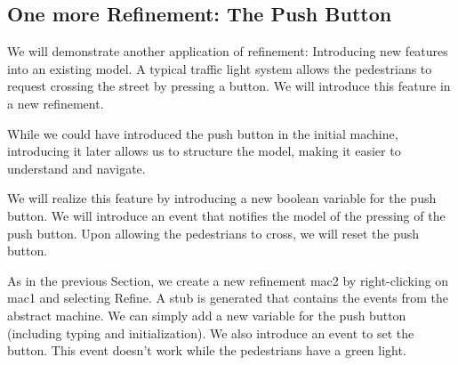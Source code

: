 {\begin{description}
\begin{description}
\begin{description}
			\end{description}
		\Witnesses
			\begin{description}
			\end{description}
		\ThenAct
			\begin{description}
			\nItemX{ act1 }{ cars\_colors :=  new\_value\_colors }
			\end{description}
		\EndAct
		\end{description}
\END
\end{description}
}

\subsection{One more Refinement: The Push Button}

We will demonstrate another application of refinement: Introducing new features into an existing model.  A typical traffic light system allows the pedestrians to request crossing the street by pressing a button.  We will introduce this feature in a new refinement.

While we could have introduced the push button in the initial machine, introducing it later allows us to structure the model, making it easier to understand and navigate.

We will realize this feature by introducing a new boolean variable for the push button.  We will introduce an event that notifies the model of the pressing of the push button.  Upon allowing the pedestrians to cross, we will reset the push button.

As in the previous Section, we create a new refinement \textsf{mac2} by right-clicking on \textsf{mac1} and selecting \textsf{Refine}.  A stub is generated that contains the events from the abstract machine.  We can simply add a new variable for the push button (including typing and initialization).  We also introduce an event to set the button.  This event doesn't work while the pedestrians have a green light.

